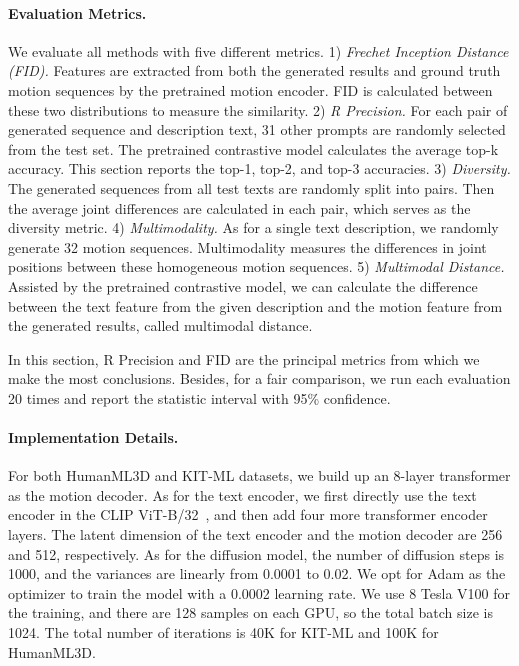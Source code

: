 \paragraph{Evaluation Metrics.}\label{sec4_1_2}
We evaluate all methods with five different metrics. 
1) \textit{Frechet Inception Distance (FID).} Features are extracted from both the generated results and ground truth motion sequences by the pretrained motion encoder. FID is calculated between these two distributions to measure the similarity. 
2) \textit{R Precision.} For each pair of generated sequence and description text, 31 other prompts are randomly selected from the test set. The pretrained contrastive model calculates the average top-k accuracy. This section reports the top-1, top-2, and top-3 accuracies.
3) \textit{Diversity.} The generated sequences from all test texts are randomly split into pairs. Then the average joint differences are calculated in each pair, which serves as the diversity metric.
4) \textit{Multimodality.} As for a single text description, we randomly generate 32 motion sequences. Multimodality measures the differences in joint positions between these homogeneous motion sequences.
5) \textit{Multimodal Distance.} Assisted by the pretrained contrastive model, we can calculate the difference between the text feature from the given description and the motion feature from the generated results, called multimodal distance. 


In this section, R Precision and FID are the principal metrics from which we make the most conclusions. Besides, for a fair comparison, we run each evaluation 20 times and report the statistic interval with 95\% confidence.


\paragraph{Implementation Details.}\label{sec4_1_3}
For both HumanML3D and KIT-ML datasets, we build up an 8-layer transformer as the motion decoder. As for the text encoder, we first directly use the text encoder in the CLIP ViT-B/32~\citep{radford2021learning}, and then add four more transformer encoder layers. The latent dimension of the text encoder and the motion decoder are 256 and 512, respectively. As for the diffusion model, the number of diffusion steps is 1000, and the variances  are linearly from 0.0001 to 0.02. We opt for Adam as the optimizer to train the model with a 0.0002 learning rate. We use 8 Tesla V100 for the training, and there are 128 samples on each GPU, so the total batch size is 1024. The total number of iterations is 40K for KIT-ML and 100K for HumanML3D.

